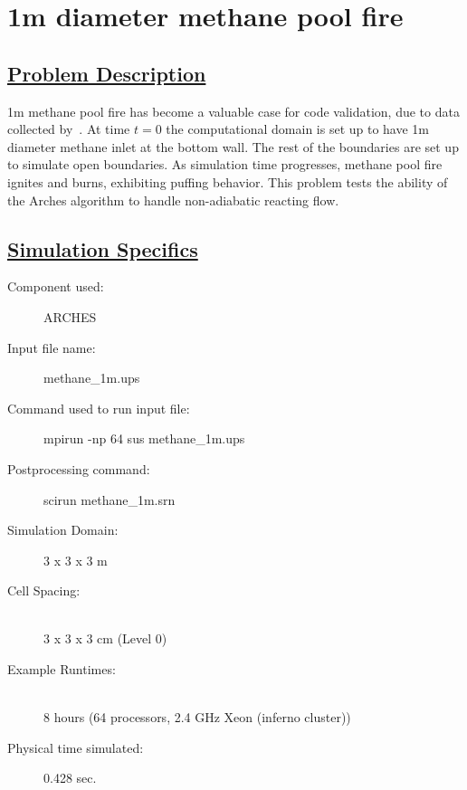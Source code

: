 \documentclass[fleqn]{article}
\begin{document}
\section*{\center 1m diameter methane pool fire}
\subsection*{\underline{Problem Description}}
1m methane pool fire has become a valuable case for code validation, due to data
collected by~\cite{tieszen}.  At time $t=0$ the computational domain is set up to have 1m diameter methane inlet at the bottom wall. The rest of the boundaries are set up to simulate open boundaries. As simulation time progresses,
methane pool fire ignites and burns, exhibiting puffing behavior. This problem tests the ability of the Arches algorithm to handle non-adiabatic reacting flow.
 
\subsection*{\underline{Simulation Specifics}}
\begin{description} 
\item [Component used:] \hfill ARCHES
\item [Input file name:] \hfill methane\_1m.ups
\item [Command used to run input file:]\hfill mpirun -np 64 sus methane\_1m.ups
\item [Postprocessing command:]\hfill scirun methane\_1m.srn

\item [Simulation Domain:]\hfill    3 x 3 x 3 m
\item [Cell Spacing:]\hfill \\ 
3 x 3 x 3 cm (Level 0)

\item [Example Runtimes:] \hfill \\
 8 hours   (64 processors, 2.4 GHz Xeon (inferno cluster))

\item [Physical time simulated:] \hfill 0.428 sec.

\end{description}
\end{document}
